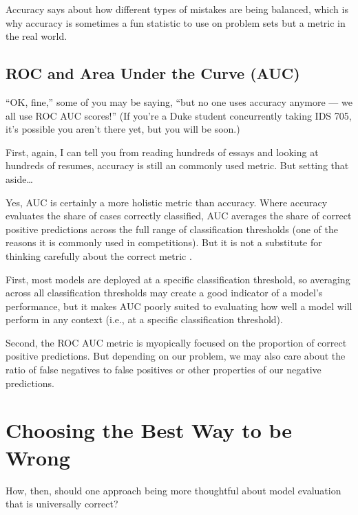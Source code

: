 \documentclass[letterpaper,10pt,english]{jupyterBook}
\begin{document}
\sphinxAtStartPar
Accuracy says  about how different types of mistakes are being balanced, which is why accuracy is sometimes a fun statistic to use on problem sets but a  metric in the real world.


\subsection{ROC and Area Under the Curve (AUC)}
\label{\detokenize{30_questions/24_passive_internal_errors:roc-and-area-under-the-curve-auc}}
\sphinxAtStartPar
“OK, fine,” some of you may be saying, “but no one uses accuracy anymore — we all use ROC AUC scores!” (If you’re a Duke student concurrently taking IDS 705, it’s possible you aren’t there yet, but you will be soon.)

\sphinxAtStartPar
First, again, I can tell you from reading hundreds of essays and looking at hundreds of resumes, accuracy is still an  commonly used metric. But setting that aside…

\sphinxAtStartPar
Yes, AUC is certainly a more holistic metric than accuracy. Where accuracy evaluates the share of cases correctly classified, AUC averages the share of correct positive predictions across the full range of classification thresholds (one of the reasons it is commonly used in competitions). But it is not a substitute for thinking carefully about the correct metric .

\sphinxAtStartPar
First, most models are deployed at a specific classification threshold, so averaging across all classification thresholds may create a good  indicator of a model’s performance, but it makes AUC poorly suited to evaluating how well a model will perform in any  context (i.e., at a specific classification threshold).

\sphinxAtStartPar
Second, the ROC AUC metric is myopically focused on the proportion of correct positive predictions. But depending on our problem, we may also care about the ratio of false negatives to false positives or other properties of our negative predictions.


\section{Choosing the Best Way to be Wrong}
\label{\detokenize{30_questions/24_passive_internal_errors:choosing-the-best-way-to-be-wrong}}
\sphinxAtStartPar
How, then, should one approach being more thoughtful about model evaluation  that is universally correct?
\end{document}
